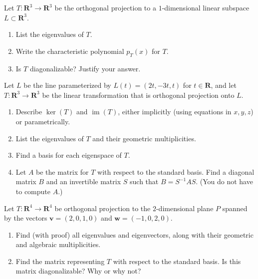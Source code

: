 \documentclass[11pt,twoside,openany]{memoir}
\begin{document}
        \newpage
        \begin{exercise}
        Let $T:\mathbf{R}^3\to \mathbf{R}^3$ be the orthogonal projection to a $1$-dimensional linear subspace $L\subset \mathbf{R}^3$.
        \begin{enumerate}[label=(\alph*)]
            \item List the eigenvalues of $T$.
            \item Write the characteristic polynomial $p_T(x)$ for $T$.
            \item Is $T$ diagonalizable? Justify your answer.
        \end{enumerate}
        \end{exercise}
        
        \begin{exercise}
        Let $L$ be the line parameterized by $L(t)=(2t,-3t,t)$ for $t\in \mathbf{R}$, and let $T:\mathbf{R}^3\to \mathbf{R}^3$ be the linear transformation that is orthogonal projection onto $L$.
        \begin{enumerate}[label=(\alph*)]
            \item Describe $\operatorname{ker}(T)$ and $\operatorname{im}(T)$, either implicitly (using equations in $x,y,z$) or parametrically.
            \item List the eigenvalues of $T$ and their geometric multiplicities.
            \item Find a basis for each eigenspace of $T$.
            \item Let $A$ be the matrix for $T$ with respect to the standard basis. Find a diagonal matrix $B$ and an invertible matrix $S$ such that $B=S^{-1}AS$. (You do not have to compute $A$.)
        \end{enumerate}
        \end{exercise}
        
        \begin{exercise}
        Let $T:\mathbf{R}^4\to \mathbf{R}^4$ be orthogonal projection to the $2$-dimensional plane $P$ spanned by the vectors $\mathbf{v}=(2,0,1,0)$ and $\mathbf{w}=(-1,0,2,0)$.
        \begin{enumerate}[label=(\alph*)]
            \item Find (with proof) all eigenvalues and eigenvectors, along with their geometric and algebraic multiplicities.
            \item Find the matrix representing $T$ with respect to the standard basis. Is this matrix diagonalizable? Why or why not?
        \end{enumerate}
        \end{exercise}
        
\end{document}
